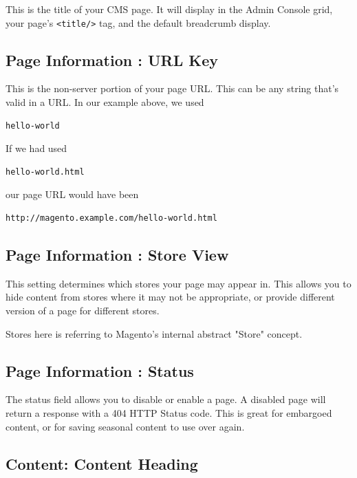 \documentclass[oneside]{book}
\begin{document}
This is the title of your CMS page.  It will display in the Admin Console grid, your page's \footnotesize\texttt{\textless title/\textgreater } \normalsize  tag, and the default breadcrumb display. 

\subsection{Page Information : URL Key}

This is the non-server portion of your page URL.  This can be any string that's valid in a URL.  In our example above, we used 

\begin{lstlisting}
hello-world

\end{lstlisting}


If we had used

\begin{lstlisting}
hello-world.html

\end{lstlisting}


our page URL would have been

\begin{lstlisting}
http://magento.example.com/hello-world.html

\end{lstlisting}


\subsection{Page Information : Store View}

This setting determines which stores your page may appear in.  This allows you to hide content from stores where it may not be appropriate, or provide different version of a page for different stores.

Stores here is referring to Magento's internal abstract "Store" concept.

\subsection{Page Information : Status}

The status field allows you to disable or enable a page.  A disabled page will return a response with a 404 HTTP Status code.  This is great for embargoed content, or for saving seasonal content to use over again.

\subsection{Content: Content Heading}
\end{document}

